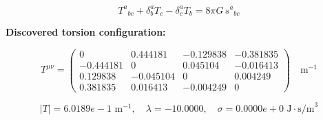 
\begin{equation}
  T^a{}_{bc} + \delta^a_b T_c - \delta^a_c T_b = 8\pi G \, s^a{}_{bc}
\end{equation}

\textbf{Discovered torsion configuration:}

\begin{equation}
  T^{\mu\nu} = \begin{pmatrix}
    0 & 0.444181 & -0.129838 & -0.381835 \\
    -0.444181 & 0 & 0.045104 & -0.016413 \\
    0.129838 & -0.045104 & 0 & 0.004249 \\
    0.381835 & 0.016413 & -0.004249 & 0
  \end{pmatrix} \quad \text{m}^{-1}
\end{equation}

\begin{equation}
  |T| = 6.0189e-1 \text{ m}^{-1}, \quad
  \lambda = -10.0000, \quad
  \sigma = 0.0000e+0 \text{ J}\cdot\text{s/m}^3
\end{equation}